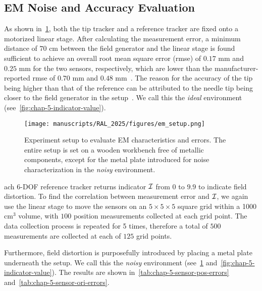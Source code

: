 \subsection{EM Noise and Accuracy Evaluation}
\label{sec:chap-5-em-evaluation}

As shown in~\cref{fig:chap-5-em-setup}, both the tip tracker and a reference tracker are fixed onto a motorized linear stage. After calculating the measurement error, a minimum distance of $70$ cm between the field generator and the linear stage is found sufficient to achieve an overall root mean square error (rmse) of $0.17$ mm and $0.25$ mm for the two sensors, respectively, which are lower than the manufacturer-reported rmse of $0.70$ mm and $0.48$ mm~\parencite{AuroraNDIsPremier2024}. The reason for the accuracy of the tip being higher than that of the reference can be attributed to the needle tip being closer to the field generator in the setup~\parencite{nakamotoMagnetoOpticHybrid3D2000}. We call this the \textit{ideal} environment (see~\cref{fig:chap-5-indicator-value}).

\begin{figure}[h]
  \centering
  \texttt{[image: manuscripts/RAL\_2025/figures/em\_setup.png]}
  \caption{Experiment setup to evaluate EM characteristics and errors. The entire setup is set on a wooden workbench free of metallic components, except for the metal plate introduced for noise characterization in the \textit{noisy} environment.}
  \label{fig:chap-5-em-setup}
\end{figure}

ach 6-DOF reference tracker returns  indicator $\mathcal{I}$ from $0$ to $9.9$ to indicate field distortion. To find the correlation between measurement error and $\mathcal{I}$, we again use the linear stage to move the sensors on an $5 \times 5 \times 5$ square grid within a 1000 cm$^3$ volume, with $100$ position measurements collected at each grid point. The data collection process is repeated for 5 times, therefore a total of $500$ measurements are collected at each of $125$ grid points.

Furthermore, field distortion is purposefully introduced by placing a metal plate underneath the setup. We call this the \textit{noisy} environment (see~\cref{fig:chap-5-em-setup} and~\cref{fig:chap-5-indicator-value}). The results are shown in~\cref{tab:chap-5-sensor-pos-errors} and~\cref{tab:chap-5-sensor-ori-errors}.

